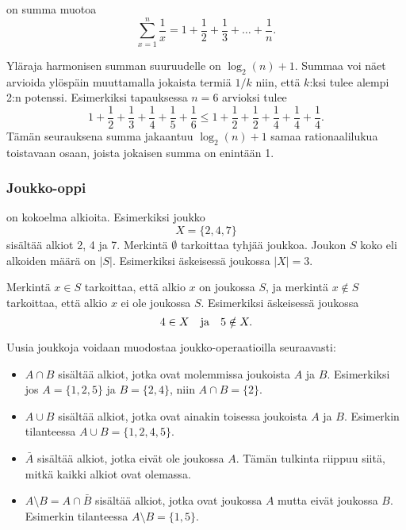  on summa muotoa
\[ \sum_{x=1}^n \frac{1}{x} = 1+\frac{1}{2}+\frac{1}{3}+\ldots+\frac{1}{n}.\]

Yläraja harmonisen summan suuruudelle on $\log_2(n)+1$.
Summaa voi näet arvioida ylöspäin
muuttamalla jokaista termiä $1/k$ niin,
että $k$:ksi tulee alempi 2:n potenssi.
Esimerkiksi tapauksessa $n=6$ arvioksi tulee
\[ 1+\frac{1}{2}+\frac{1}{3}+\frac{1}{4}+\frac{1}{5}+\frac{1}{6} \le
1+\frac{1}{2}+\frac{1}{2}+\frac{1}{4}+\frac{1}{4}+\frac{1}{4}.\]
Tämän seurauksena summa jakaantuu $\log_2(n)+1$ samaa
rationaalilukua toistavaan osaan, joista jokaisen summa on enintään 1.

\subsubsection{Joukko-oppi}


 on kokoelma alkioita.
Esimerkiksi joukko
\[X=\{2,4,7\}\]
sisältää alkiot 2, 4 ja 7.
Merkintä $\emptyset$ tarkoittaa tyhjää joukkoa.
Joukon $S$ koko eli alkoiden määrä on $|S|$.
Esimerkiksi äskeisessä joukossa $|X|=3$.

Merkintä $x \in S$ tarkoittaa,
että alkio $x$ on joukossa $S$,
ja merkintä $x \notin S$ tarkoittaa,
että alkio $x$ ei ole joukossa $S$.
Esimerkiksi äskeisessä joukossa
\[4 \in X \hspace{10px}\textrm{ja}\hspace{10px} 5 \notin X.\]

\begin{samepage}
Uusia joukkoja voidaan muodostaa joukko-operaatioilla
seuraavasti:
\begin{itemize}
\item {} $A \cap B$ sisältää alkiot,
jotka ovat molemmissa joukoista $A$ ja $B$.
Esimerkiksi jos $A=\{1,2,5\}$ ja $B=\{2,4\}$,
niin $A \cap B = \{2\}$.
\item {} $A \cup B$ sisältää alkiot,
jotka ovat ainakin toisessa joukoista $A$ ja $B$.
Esimerkin tilanteessa $A \cup B = \{1,2,4,5\}$.
\item {} $\bar A$ sisältää alkiot,
jotka eivät ole joukossa $A$.
Tämän tulkinta riippuu siitä, mitkä kaikki
alkiot ovat olemassa.
\item {} $A \setminus B = A \cap \bar B$ sisältää alkiot,
jotka ovat joukossa $A$ mutta eivät joukossa $B$.
Esimerkin tilanteessa $A \setminus B = \{1,5\}$.
\end{itemize}
\end{samepage}


